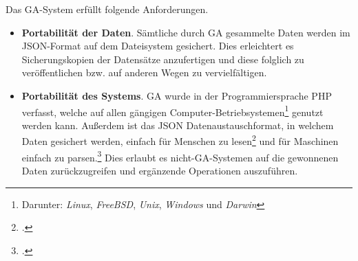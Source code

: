 Das GA-System erfüllt folgende Anforderungen.

\begin{itemize}
\item
  \textbf{Portabilität der Daten}. Sämtliche durch GA gesammelte Daten werden im
  JSON-Format auf dem Dateisystem gesichert. Dies erleichtert es
  Sicherungskopien der Datensätze anzufertigen und diese folglich zu
  veröffentlichen bzw. auf anderen Wegen zu vervielfältigen.
\item
  \textbf{Portabilität des Systems}. GA wurde in der Programmiersprache PHP
  verfasst, welche auf allen gängigen Computer-Betriebsystemen\footnote{
  Darunter: \emph{Linux}, \emph{FreeBSD}, \emph{Unix}, \emph{Windows}
  und \emph{Darwin}} genutzt werden kann. Außerdem ist das JSON
  Datenaustauschformat, in welchem Daten gesichert werden, einfach für Menschen
  zu lesen\footcite{jsonDe} und für Maschinen einfach zu
  parsen.\footcite{jsonDe} Dies erlaubt es nicht-GA-Systemen auf die gewonnenen
  Daten zurückzugreifen und ergänzende Operationen auszuführen.
\end{itemize}
